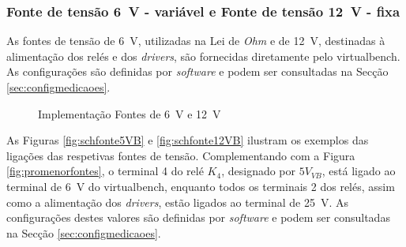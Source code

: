 \subsubsection{Fonte de tensão \SI{6}{\volt} - variável e {Fonte de tensão \SI{12}{\volt} - fixa}}
\label{sec:fontes6-12}
As fontes de tensão de \SI{6}{\volt}, utilizadas na Lei de \textit{Ohm} e de \SI{12}{\volt}, destinadas à alimentação dos relés e dos \textit{drivers}, são fornecidas diretamente pelo \acrshort{virtualbench}. As configurações são definidas por \textit{software} e podem ser consultadas na Secção \ref{sec:configmedicaoes}.

\begin{figure}[hbtp]
	\centering%
		\centering
		\qquad
		\caption{Implementação Fontes de \SI{6}{\volt} e \SI{12}{\volt}}%
		\label{fig:fontes6-12}%
	\end{figure}

As Figuras \ref{fig:schfonte5VB} e \ref{fig:schfonte12VB} ilustram os exemplos das ligações das respetivas fontes de tensão. Complementando com a Figura \ref{fig:promenorfontes}, o terminal 4 do relé $K_{4}$, designado por $5V_{VB}$, está ligado ao terminal de \SI{6}{\volt} do \acrshort{virtualbench}, enquanto todos os terminais 2 dos relés, assim como a alimentação dos \textit{drivers}, estão ligados ao terminal de \SI{25}{\volt}. As configurações destes valores são definidas por \textit{software} e podem ser consultadas na Secção \ref{sec:configmedicaoes}.

